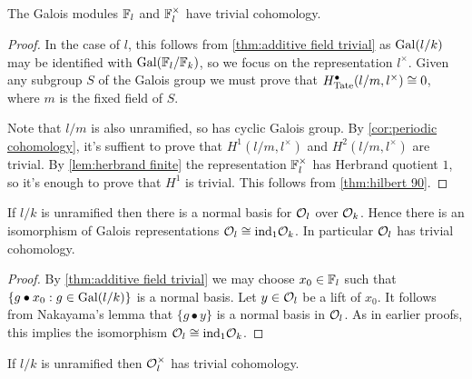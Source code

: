\begin{lemma} \label{lem:finite field trivial}
	The Galois modules ${\mathbb F}_l$ and ${\mathbb F}_l^\times$ have trivial cohomology.
\end{lemma}

\begin{proof}
	In the case of $l$, this follows from \ref{thm:additive field trivial} as $\mathrm{Gal}(l/k)$ may be
	identified with $\mathrm{Gal}({\mathbb F}_l / {\mathbb F}_k)$, so we focus on the
	representation $l^\times$. Given any subgroup $S$ of the Galois group we must prove that
	$H^\bullet_{\mathrm{Tate}}(l/m,l^\times) \cong 0$, where $m$ is the fixed field of $S$.

	Note that $l/m$ is also unramified, so has cyclic Galois group.
	By \ref{cor:periodic cohomology},
	it's suffient to prove that $H^1(l/m,l^\times)$ and $H^2(l/m,l^\times)$ are trivial.
	By \ref{lem:herbrand finite} the representation ${\mathbb F}_l^\times$ has Herbrand quotient $1$,
	so it's enough to prove that $H^1$ is trivial.
	This follows from \ref{thm:hilbert 90}.
\end{proof}


\begin{lemma} \label{lem:unramified additive trivial}
	If $l/k$ is unramified then there is a normal basis for ${\mathcal O}_l$ over ${\mathcal O}_k$.
	Hence there is an isomorphism of Galois representations ${\mathcal O}_l \cong \mathrm{ind}_1 {\mathcal O}_k$.
	In particular ${\mathcal O}_l$ has trivial cohomology.
\end{lemma}

\begin{proof}
	By \ref{thm:additive field trivial}
	we may choose $x_0 \in {\mathbb F}_l$
	such that $\{g \bullet x_0 :g \in \mathrm{Gal}(l/k)\}$ is a normal basis.
	Let $y \in {\mathcal O}_l$ be a lift of $x_0$.
	It follows from Nakayama's lemma that $\{g \bullet y\}$ is a normal basis	in ${\mathcal O}_l$.
	As in earlier proofs, this implies the isomorphism ${\mathcal O}_l \cong \mathrm{ind}_1 {\mathcal O}_k$.
\end{proof}




\begin{lemma}	\label{lem:unramified units trivial}
	If $l/k$ is unramified then ${\mathcal O}_l^\times$ has trivial cohomology.
\end{lemma}

